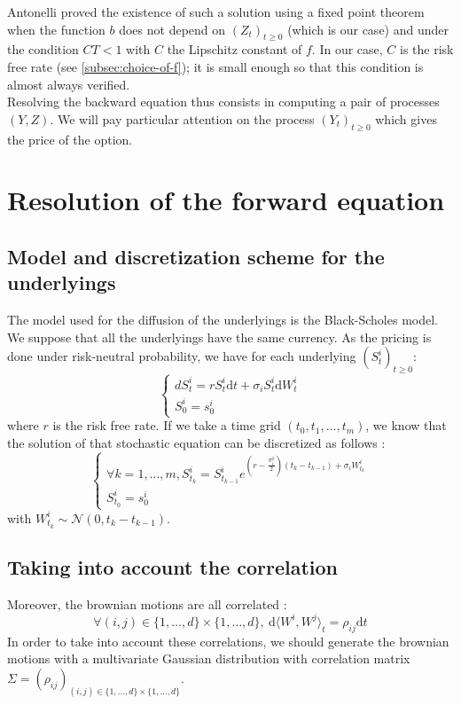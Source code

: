 \documentclass[a4paper,11pt,english]{book}
\begin{document}
Antonelli \cite{antonelli1993backward} proved the existence of such a solution using a fixed point theorem when the function $b$ does not depend on $(Z_{t})_{t\geq0}$ (which is our case) and under the condition $CT<1$ with $C$ the Lipschitz constant of $f$. In our case, $C$ is the risk free rate (see \ref{subsec:choice-of-f}); it is small enough so that this condition is almost always verified.\\

Resolving the backward equation thus consists in computing a pair of processes $(Y,Z)$. We will pay particular attention on the process $(Y_{t})_{t\geq0}$ which gives the price of the option.

\section{Resolution of the forward equation}
\subsection{Model and discretization scheme for the underlyings}
\label{subsec:underlying-discretization}
The model used for the diffusion of the underlyings is the Black-Scholes model. We suppose that all the underlyings have the same currency. As the pricing is done under risk-neutral probability, we have for each underlying $(S^{i}_{t})_{t\geq0}$:
$$
\begin{cases}
dS_{t}^{i}=r S_{t}^{i} \text{d}t+\sigma_{i} S_{t}^{i} \text{d}W_{t}^{i} \\
S_{0}^{i}=s_{0}^{i} 
\end{cases}
$$
where $r$ is the risk free rate.
If we take a time grid $(t_{0},t_{1},\ldots,t_{m})$, we know that the solution of that stochastic equation can be discretized as follows :
$$\begin{cases}
\forall k=1,\ldots,m,  S_{t_{k}}^{i}=S_{t_{k-1}}^{i}e^{(r-\frac{\sigma_{i}^{2}}{2})(t_{k}-t_{k-1})+\sigma_{i}W_{t_{k}}^{i}}\\
S_{t_{0}}^{i}=s_{0}^{i} 
\end{cases}
$$
with $W_{t_{k}}^{i} \sim \mathcal{N}(0,t_{k}-t_{k-1})$.\\

\subsection{Taking into account the correlation}
Moreover, the brownian motions are all correlated : $$\forall (i,j) \in \{1,\ldots,d\}\times\{1,\ldots,d\},~ \text{d}\langle W^{i},W^{j}\rangle_t=\rho_{ij}\text{d}t$$
In order to take into account these correlations, we should generate the brownian motions with a multivariate Gaussian distribution with correlation matrix $\Sigma=(\rho_{ij})_{(i,j) \in \{1,\ldots,d\}\times\{1,\ldots,d\}}$.\\
\end{document}
